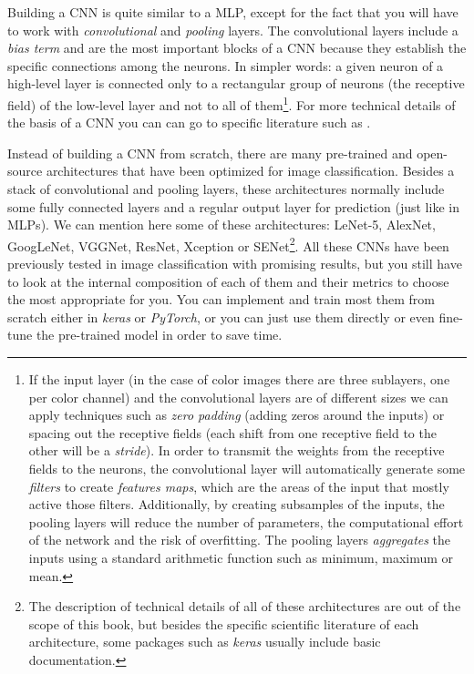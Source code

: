 Building a CNN is quite similar to a MLP, except for the fact that you will have to work with \textit{convolutional} and \textit{pooling} layers. The convolutional layers include a \textit{bias term} and are the most important blocks of a CNN because they establish the specific connections  among the neurons. In simpler words: a given neuron of a high-level layer is connected only to a rectangular group of neurons (the receptive field) of the low-level layer and not to all of them\footnote{If the input layer (in the case of color images there are three sublayers, one per color channel) and the convolutional layers are of different sizes we can apply techniques such as \textit{zero padding} (adding zeros around the inputs) or spacing out the receptive fields (each shift from one receptive field to the other will be a \textit{stride}). In order to transmit the weights from the receptive fields to the neurons, the convolutional layer will automatically generate some \textit{filters} to create \textit{features maps}, which are the areas of the input that mostly active those filters. Additionally, by creating subsamples of the inputs, the pooling layers will reduce the number of parameters, the computational effort of the network and the risk of overfitting. The pooling layers \textit{aggregates} the inputs using a standard arithmetic function such as minimum, maximum or mean.}. For more technical details of the basis of a CNN you can can go to specific literature such as \cite{geron2019hands}.

Instead of building a CNN from scratch, there are many pre-trained and open-source architectures that have been optimized for image classification. Besides a stack of convolutional and pooling layers,  these architectures normally include some fully connected layers and a regular output layer for prediction (just like in MLPs). We can mention here some of these architectures: LeNet-5, AlexNet, GoogLeNet, VGGNet, ResNet, Xception or SENet\footnote{The description of technical details of all of these architectures are out of the scope of this book, but besides the specific scientific literature of each architecture, some packages such as \emph{keras} usually include basic documentation.}. All these CNNs have been previously tested in image classification with promising results, but you still have to look at the internal composition of each of them and their metrics to choose the most appropriate for you. You can implement and train most them from scratch either in \emph{keras} or \emph{PyTorch}, or you can just use them directly or even fine-tune the pre-trained model in order to save time.

